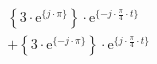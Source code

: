 \[
\begin{split}
&   \left \{ 3 \cdot \textrm{e}^{\{  j \cdot \pi \}} \right \} \cdot \textrm{e}^{\{- j \cdot \frac{\pi}{4} \cdot t \}}\\
&+  \left \{ 3 \cdot \textrm{e}^{\{ -j \cdot \pi \}} \right \} \cdot \textrm{e}^{\{  j \cdot \frac{\pi}{4} \cdot t \}}\\
\end{split}
\]
